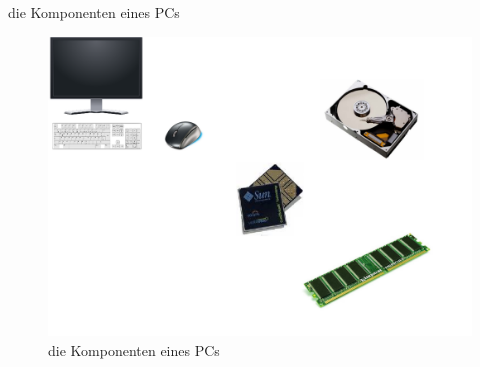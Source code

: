 \begin{frame}{die Komponenten eines PCs}

\begin{figure}
\includegraphics[width=1\textwidth]{pics/pc-komponenten}

\caption{die Komponenten eines PCs}
\end{figure}
\end{frame}

